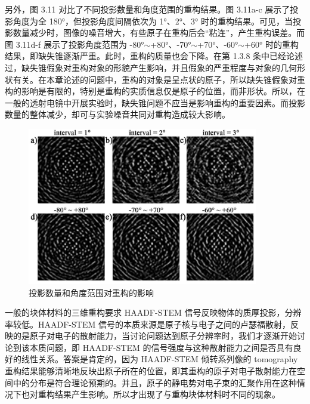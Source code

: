 另外，图 3.11 对比了不同投影数量和角度范围的重构结果。图 3.11a-c 展示了投影角度为全 180°，但投影角度间隔依次为 1°、2°、3° 时的重构结果。可见，当投影数量减少时，图像的噪音增大，有些原子在重构后会“粘连”，产生重构误差。而图 3.11d-f 展示了投影角度范围为 -80°$\sim$+80°、-70°$\sim$+70°、-60°$\sim$+60° 时的重构结果，即缺失锥逐渐严重。此时，重构的质量也会下降。在第 1.3.8 条中已经论述过，缺失锥假象对重构对象的形貌产生影响，并且假象的严重程度与对象的几何形状有关。在本章论述的问题中，重构的对象是呈点状的原子，所以缺失锥假象对重构的影响是有限的，特别是重构的实质信息仅是原子的位置，而非形状。所以，在一般的透射电镜中开展实验时，缺失锥问题不应当是影响重构的重要因素。而投影数量的整体减少，却可与实验噪音共同对重构造成较大影响。


\begin{figure}[htbp]
	\vspace{\baselineskip}
	\centering
	\includegraphics[width=0.9\textwidth]{../4.12/412}
	\caption{投影数量和角度范围对重构的影响}\label{fig:412}
	\song{}
\end{figure}


一般的块体材料的三维重构要求 HAADF-STEM 信号反映物体的质厚投影，分辨率较低。HAADF-STEM 信号的本质来源是原子核与电子之间的卢瑟福散射，反映的是原子对电子的散射能力，当讨论问题达到原子分辨率时，我们才逐渐开始讨论到该本质问题，即 HAADF-STEM 的信号强度与这种散射能力之间是否具有良好的线性关系。答案是肯定的，因为 HAADF-STEM 倾转系列像的 tomography 重构结果能够清晰地反映出原子所在的位置，即其重构的原子对电子散射能力在空间中的分布是符合理论预期的。并且，原子的静电势对电子束的汇聚作用在这种情况下也对重构结果产生影响。所以才出现了与重构块体材料时不同的现象。

